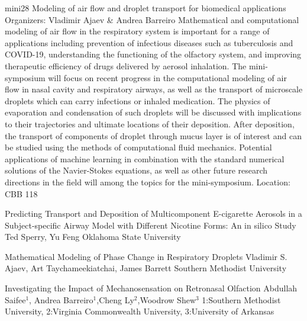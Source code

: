\mini
{mini28}
{Modeling of air flow and droplet transport for biomedical applications}
{Organizers: Vladimir Ajaev \& Andrea Barreiro}
{Mathematical and computational modeling of air flow in the respiratory system is important for a range of applications including prevention of infectious diseases such as tuberculosis and COVID-19, understanding the functioning of the olfactory system, and improving therapeutic efficiency of drugs delivered by aerosol inhalation. The mini-symposium will focus on recent progress in the computational modeling of air flow in nasal cavity and respiratory airways, as well as the transport of microscale droplets which can carry infections or inhaled medication.    The physics of evaporation and condensation of such droplets will be discussed with implications to their trajectories and ultimate locations of their deposition. After deposition, the transport of components of droplet through mucus layer is of interest and can be studied using the methods of computational fluid mechanics. Potential applications of machine learning in combination with the standard numerical solutions of the Navier-Stokes equations, as well as other future research directions in the field will among the topics for the mini-symposium.}
{Location: CBB 118}

\begin{talks}
\item\talk
{Predicting Transport and Deposition of Multicomponent E-cigarette Aerosols in a Subject-specific Airway Model with Different Nicotine Forms: An in silico Study}
{Ted Sperry, Yu Feng}
{Oklahoma State University}
\item\talk
{Mathematical Modeling of Phase Change in Respiratory Droplets}
{Vladimir S. Ajaev, Art Taychameekiatchai, James Barrett}
{Southern Methodist University}
\item\talk
{Investigating the Impact of Mechanosensation on Retronasal Olfaction}
{Abdullah Saifee$^1$, Andrea Barreiro$^1$,Cheng Ly$^2$,Woodrow Shew$^3$}
{1:Southern Methodist University, 2:Virginia Commonwealth University, 3:University of Arkansas}
\end{talks}
\room
